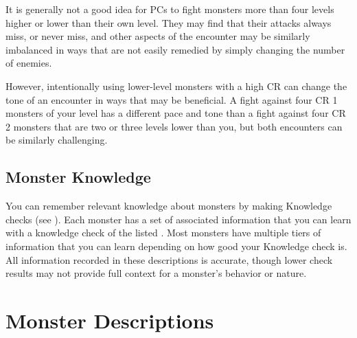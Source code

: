         It is generally not a good idea for PCs to fight monsters more than four levels higher or lower than their own level.
        They may find that their attacks always miss, or never miss, and other aspects of the encounter may be similarly imbalanced in ways that are not easily remedied by simply changing the number of enemies.

        However, intentionally using lower-level monsters with a high CR can change the tone of an encounter in ways that may be beneficial.
        A fight against four CR 1 monsters of your level has a different pace and tone than a fight against four CR 2 monsters that are two or three levels lower than you, but both encounters can be similarly challenging.

    \subsection{Monster Knowledge}
        You can remember relevant knowledge about monsters by making Knowledge checks (see ).
        Each monster has a set of associated information that you can learn with a knowledge check of the listed .
        Most monsters have multiple tiers of information that you can learn depending on how good your Knowledge check is.
        All information recorded in these descriptions is accurate, though lower check results may not provide full context for a monster's behavior or nature.

\section{Monster Descriptions}


